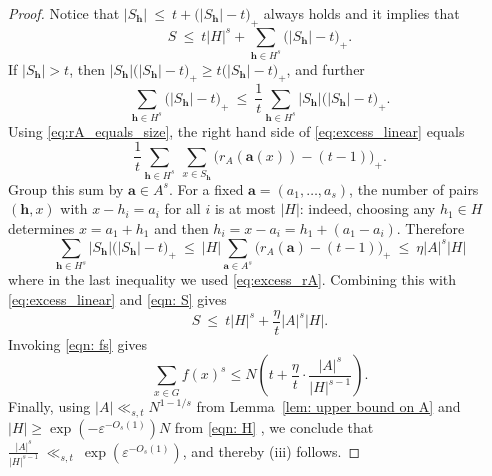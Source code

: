 \documentclass[A4paper,reqno,oneside,12pt]{amsart}
\theoremstyle{plain}
\theoremstyle{definition}
\newcommand{\e}{\mathbbm{1}}          %
\begin{document}
\begin{proof}
Notice that $|S_{\mathbf{h}}|\ \le\ t+\bigl(|S_{\mathbf{h}}|-t\bigr)_+$ always holds and it implies that
\begin{equation}\label{eqn: S}
   S\ \le\ t|H|^s+\sum_{\mathbf{h}\in H^s}\bigl(|S_{\mathbf{h}}|-t\bigr)_+. 
\end{equation}
If $|S_{\mathbf{h}}|>t$, then $|S_{\mathbf{h}}|\bigl(|S_{\mathbf{h}}|-t\bigr)_+\ge
t\bigl(|S_{\mathbf{h}}|-t\bigr)_+$, and further
\begin{equation}\label{eq:excess_linear}
\sum_{\mathbf{h}\in H^s}\bigl(|S_{\mathbf{h}}|-t\bigr)_+
\ \le\ \frac1t\sum_{\mathbf{h}\in H^s}|S_{\mathbf{h}}|\bigl(|S_{\mathbf{h}}|-t\bigr)_+.
\end{equation}
Using \eqref{eq:rA_equals_size}, the right hand side of \eqref{eq:excess_linear} equals
\[
\frac1t\sum_{\mathbf{h}\in H^s}\ \sum_{x\in S_{\mathbf{h}}}\bigl(r_A(\mathbf{a}(x))-(t-1)\bigr)_+.
\]
Group this sum by $\mathbf{a}\in A^s$.  For a fixed $\mathbf{a}=(a_1,\dots,a_s)$, the number of pairs
$(\mathbf{h},x)$ with $x-h_i=a_i$ for all $i$ is at most $|H|$: indeed, choosing any $h_1\in H$ determines
$x=a_1+h_1$ and then $h_i=x-a_i=h_1+(a_1-a_i)$. Therefore
\[
\sum_{\mathbf{h}\in H^s}|S_{\mathbf{h}}|\bigl(|S_{\mathbf{h}}|-t\bigr)_+
\ \le\ |H|\sum_{\mathbf{a}\in A^s}\bigl(r_A(\mathbf{a})-(t-1)\bigr)_+
\ \le\ \eta |A|^s |H|
\]
where in the last inequality we used
\eqref{eq:excess_rA}.  Combining this with \eqref{eq:excess_linear} and \eqref{eqn: S} gives
\[
S\ \le\ t|H|^s+\frac{\eta}{t}|A|^s|H|.
\]
Invoking \eqref{eqn: fs} gives
\[
\sum_{x\in G} f(x)^s
\le
N\left(t+\frac{\eta}{t}\cdot\frac{|A|^s}{|H|^{s-1}}\right).
\]
Finally, using $|A|\ll_{s,t}N^{1-1/s}$ from Lemma~\ref{lem: upper bound on A} and
$|H|\ge \exp(-\varepsilon^{-O_s(1)})N$ from \eqref{eqn: H} , we conclude that
$
\frac{|A|^s}{|H|^{s-1}}
\ \ll_{s,t}\ \exp(\varepsilon^{-O_s(1)})$,
and thereby (iii) follows.
\end{proof}

\end{document}
